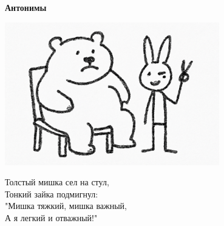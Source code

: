 \vspace*{\fill}
\begin{center}
  {\huge\textbf{Антонимы}}

  \vspace{1.5em}  \includegraphics[width=0.7\textwidth]{pictures/opposites.jpg}
  \vspace{4em}
  \parbox{0.6\textwidth}{
    \LARGE
    \begin{spacing}{1.2}
      Толстый мишка сел на стул,\\
      Тонкий зайка подмигнул:\\
      "Мишка тяжкий, мишка важный,\\
      А я легкий и отважный!" %
    \end{spacing}
      
  }
\end{center}
\vspace*{\fill}